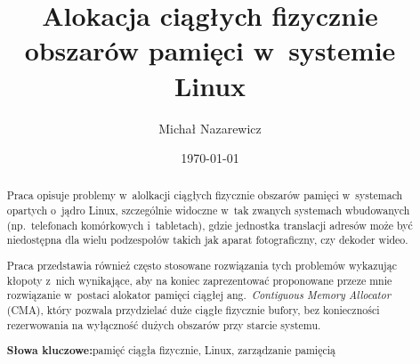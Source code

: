 \documentclass[runningheads,a4paper,twoside]{llncs}
\title{Alokacja ciągłych fizycznie obszarów pamięci w~systemie Linux}
\author{Michał Nazarewicz}
\date{\today}
\institute{Instytut Informatyki Politechniki Warszawskiej,\\
\href{mailto:mina86@mina86.com}{\path|mina86@mina86.com|}}
\newcommand*{\ang}[1]{ang.\ \textit{#1}}
\newcommand{\keywords}[1]{\par\addvspace\baselineskip
\noindent\textbf{Słowa kluczowe:}\enspace\ignorespaces#1}
\begin{document}

\mainmatter

\maketitle

\begin{abstract}
Praca opisuje problemy w~alolkacji ciągłych fizycznie obszarów pamięci
w~systemach opartych o~jądro Linux, szczególnie widoczne w~tak
zwanych systemach wbudowanych (np.\ telefonach komórkowych
i~tabletach), gdzie jednostka translacji adresów może być niedostępna
dla wielu podzespołów takich jak aparat fotograficzny, czy dekoder
wideo.

Praca przedstawia również często stosowane rozwiązania tych problemów
wykazując kłopoty z~nich wynikające, aby na koniec zaprezentować
proponowane przeze mnie rozwiązanie w~postaci alokator pamięci ciągłej
\ang{Contiguous Memory Allocator} (CMA), który pozwala przydzielać
duże ciągłe fizycznie bufory, bez konieczności rezerwowania na
wyłączność dużych obszarów przy starcie systemu.

\keywords{pamięć ciągła fizycznie, Linux, zarządzanie pamięcią}
\end{abstract}






\appendix
\printbibliography
\end{document}
